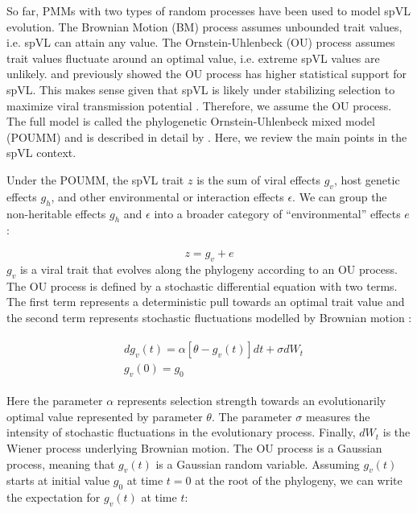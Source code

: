 \documentclass[11pt]{article}
\begin{document}
\begin{linenumbers}
So far, PMMs with two types of random processes have been used to model spVL evolution. The Brownian Motion (BM) process assumes unbounded trait values, i.e. spVL can attain any value. The Ornstein-Uhlenbeck (OU) process assumes trait values fluctuate around an optimal value, i.e. extreme spVL values are unlikely. \citet{Mitov2018} and \citet{Bertels2018} previously showed the OU process has higher statistical support for spVL. This makes sense given that spVL is likely under stabilizing selection to maximize viral transmission potential \citep{Fraser2014}. Therefore, we assume the OU process. The full model is called the phylogenetic Ornstein-Uhlenbeck mixed model (POUMM) and is described in detail by \citet{Mitov2018}. Here, we review the main points in the spVL context.

Under the POUMM, the spVL trait $z$ is the sum of viral effects $g_v$, host genetic effects $g_h$, and other environmental or interaction effects $\epsilon$. We can group the non-heritable effects $g_h$ and $\epsilon$ into a broader category of ``environmental'' effects $e$: 

\begin{equation}
    z = g_{v} + e
\end{equation}
$g_v$ is a viral trait that evolves along the phylogeny according to an OU process. The OU process is defined by a stochastic differential equation with two terms. The first term represents a deterministic pull towards an optimal trait value and the second term represents stochastic fluctuations modelled by Brownian motion \citep{Butler2004}:

\begin{align}
\begin{split}
	&dg_v(t) = \alpha[\theta - g_v(t)]dt + \sigma dW_t \\
	&g_v(0) = g_0 
	\label{eq:OUprocess}
\end{split}
\end{align}

Here the parameter $\alpha$ represents selection strength towards an evolutionarily optimal value represented by parameter $\theta$. The parameter $\sigma$ measures the intensity of stochastic fluctuations in the evolutionary process. Finally, $dW_t$ is the Wiener process underlying Brownian motion. The OU process is a Gaussian process, meaning that $g_v(t)$ is a Gaussian random variable. Assuming $g_v(t)$ starts at initial value $g_0$ at time $t = 0$ at the root of the phylogeny, we can write the expectation for $g_v(t)$ at time $t$: 


\end{linenumbers}
\end{document}
